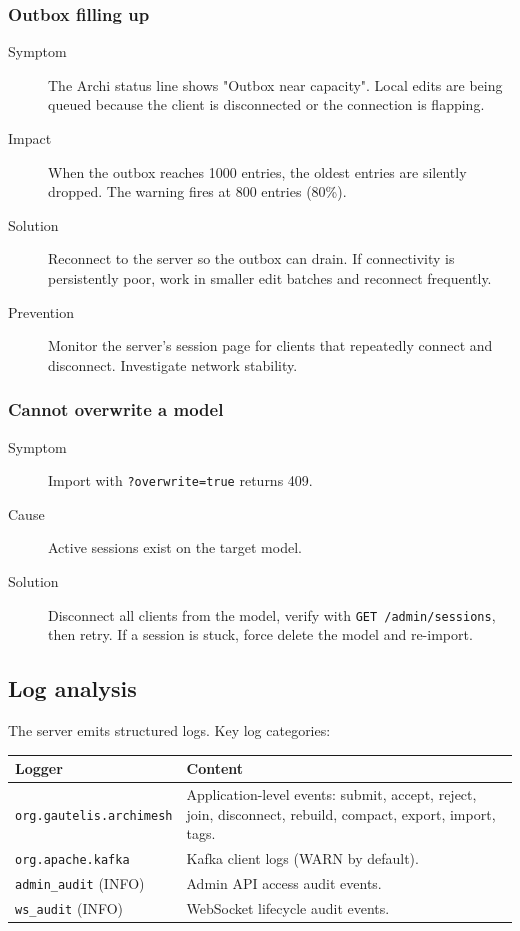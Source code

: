 \subsubsection{Outbox filling up}

\begin{description}
\item[Symptom] The Archi status line shows "Outbox near capacity". Local
  edits are being queued because the client is disconnected or the
  connection is flapping.
\item[Impact] When the outbox reaches 1000 entries, the oldest entries are
  silently dropped. The warning fires at 800 entries (80\%).
\item[Solution] Reconnect to the server so the outbox can drain. If
  connectivity is persistently poor, work in smaller edit batches and
  reconnect frequently.
\item[Prevention] Monitor the server's session page for clients that
  repeatedly connect and disconnect. Investigate network stability.
\end{description}

\subsubsection{Cannot overwrite a model}

\begin{description}
\item[Symptom] Import with \texttt{?overwrite=true} returns 409.
\item[Cause] Active sessions exist on the target model.
\item[Solution] Disconnect all clients from the model, verify with
  \texttt{GET /admin/sessions}, then retry. If a session is stuck, force
  delete the model and re-import.
\end{description}

\subsection{Log analysis}

The server emits structured logs. Key log categories:

\begin{longtable}{p{46mm}p{108mm}}
\toprule
Logger & Content \\
\midrule
\texttt{org.gautelis.archimesh} & Application-level events: submit, accept,
  reject, join, disconnect, rebuild, compact, export, import, tags. \\
\texttt{org.apache.kafka} & Kafka client logs (WARN by default). \\
\texttt{admin\_audit} (INFO) & Admin API access audit events. \\
\texttt{ws\_audit} (INFO) & WebSocket lifecycle audit events. \\
\bottomrule
\end{longtable}

